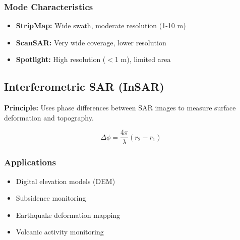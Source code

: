 \documentclass[a0paper,landscape,20pt]{extarticle}
\begin{document}
\begin{multicols}{4}
\subsubsection{Mode Characteristics}
\begin{itemize}
  \item \textbf{StripMap:} Wide swath, moderate resolution (1-10 m)
  \item \textbf{ScanSAR:} Very wide coverage, lower resolution  
  \item \textbf{Spotlight:} High resolution ($<$1 m), limited area
\end{itemize}

\subsection{Interferometric SAR (InSAR)}

\textbf{Principle:} Uses phase differences between SAR images to measure surface deformation and topography.

\begin{center}
\end{center}

$$\Delta\phi = \frac{4\pi}{\lambda}(r_2 - r_1)$$

\subsubsection{Applications}
\begin{itemize}
  \item Digital elevation models (DEM)
  \item Subsidence monitoring
  \item Earthquake deformation mapping
  \item Volcanic activity monitoring
\end{itemize}


\end{multicols}
\end{document}
